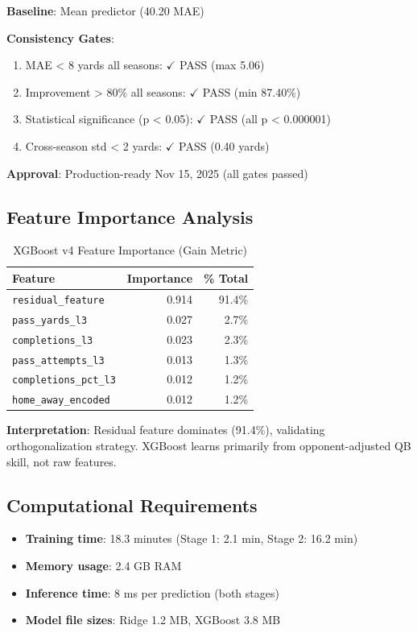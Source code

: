 \textbf{Baseline}: Mean predictor (40.20 MAE)

\textbf{Consistency Gates}:
\begin{enumerate}
\item MAE < 8 yards all seasons: $\checkmark$ PASS (max 5.06)
\item Improvement > 80\% all seasons: $\checkmark$ PASS (min 87.40\%)
\item Statistical significance (p < 0.05): $\checkmark$ PASS (all p < 0.000001)
\item Cross-season std < 2 yards: $\checkmark$ PASS (0.40 yards)
\end{enumerate}

\textbf{Approval}: Production-ready Nov 15, 2025 (all gates passed)

\subsection{Feature Importance Analysis}

\begin{table}[htbp]
\centering
\caption{XGBoost v4 Feature Importance (Gain Metric)}
\label{tab:xgboost-v4-importance}
\begin{tabular}{lrr}
\toprule
\textbf{Feature} & \textbf{Importance} & \textbf{\% Total} \\
\midrule
\texttt{residual\_feature} & 0.914 & 91.4\% \\
\texttt{pass\_yards\_l3} & 0.027 & 2.7\% \\
\texttt{completions\_l3} & 0.023 & 2.3\% \\
\texttt{pass\_attempts\_l3} & 0.013 & 1.3\% \\
\texttt{completions\_pct\_l3} & 0.012 & 1.2\% \\
\texttt{home\_away\_encoded} & 0.012 & 1.2\% \\
\bottomrule
\end{tabular}
\end{table}

\textbf{Interpretation}: Residual feature dominates (91.4\%), validating orthogonalization strategy. XGBoost learns primarily from opponent-adjusted QB skill, not raw features.

\subsection{Computational Requirements}

\begin{itemize}
\item \textbf{Training time}: 18.3 minutes (Stage 1: 2.1 min, Stage 2: 16.2 min)
\item \textbf{Memory usage}: 2.4 GB RAM
\item \textbf{Inference time}: 8 ms per prediction (both stages)
\item \textbf{Model file sizes}: Ridge 1.2 MB, XGBoost 3.8 MB
\end{itemize}

